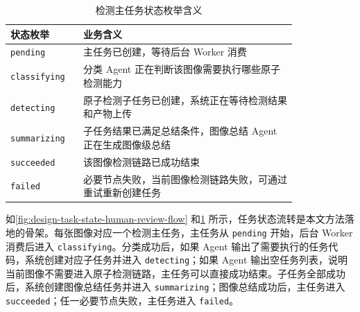 \begin{table}[!htb]
  \caption{检测主任务状态枚举含义}\label{tab:detection-state-meaning}
  \centering
  \begin{tabular}{@{}p{0.18\linewidth}p{0.64\linewidth}@{}} \toprule
    \textbf{状态枚举} & \textbf{业务含义} \\ \midrule
    \texttt{pending} & 主任务已创建，等待后台 Worker 消费 \\
    \texttt{classifying} & 分类 Agent 正在判断该图像需要执行哪些原子检测能力 \\
    \texttt{detecting} & 原子检测子任务已创建，系统正在等待检测结果和产物上传 \\
    \texttt{summarizing} & 子任务结果已满足总结条件，图像总结 Agent 正在生成图像级总结 \\
    \texttt{succeeded} & 该图像检测链路已成功结束 \\
    \texttt{failed} & 必要节点失败，当前图像检测链路失败，可通过重试重新创建任务 \\ \bottomrule
  \end{tabular}
\end{table}

如\cref{fig:design-task-state-human-review-flow} 和\cref{tab:detection-state-meaning} 所示，任务状态流转是本文方法落地的骨架。每张图像对应一个检测主任务，主任务从 \texttt{pending} 开始，后台 Worker 消费后进入 \texttt{classifying}。分类成功后，如果 Agent 输出了需要执行的任务代码，系统创建对应子任务并进入 \texttt{detecting}；如果 Agent 输出空任务列表，说明当前图像不需要进入原子检测链路，主任务可以直接成功结束。子任务全部成功后，系统创建图像总结任务并进入 \texttt{summarizing}；图像总结成功后，主任务进入 \texttt{succeeded}；任一必要节点失败，主任务进入 \texttt{failed}。

